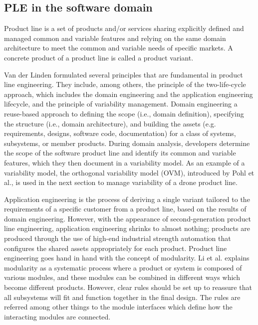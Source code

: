 \documentclass[sigconf,review]{acmart}
\begin{document}
\subsection{PLE in the software domain}
\label{sec:product line engineering}


Product line is a set of products and/or services sharing explicitly defined and managed common and variable features and relying on the same domain architecture to meet the common and variable needs of specific markets.
A concrete product of a product line is called a product variant.

Van der Linden formulated several principles that are fundamental in product line engineering. 
They include, among others, the principle of the two-life-cycle approach, which includes the domain engineering and the application engineering lifecycle, and the principle of variability management.
Domain engineering a reuse-based approach to defining the scope (i.e., domain definition), specifying the structure (i.e., domain architecture), and building the assets (e.g. requirements, designs, software code, documentation) for a class of systems, subsystems, or member products.
During domain analysis, developers determine the scope of the software product line and identify its common and variable features, which they then document in a variability model.
As an example of a variability model, the orthogonal variability model (OVM), introduced by Pohl et al., is used in the next section to manage variability of a drone product line. 

Application engineering is the process of deriving a single variant tailored to the requirements of a specific customer from a product line, based on the results of domain engineering. 
However, with the appearance of second-generation product line engineering, application engineering shrinks to almost nothing; products are produced through the use of high-end industrial strength automation that configures the shared assets appropriately for each product.
Product line engineering goes hand in hand with the concept of modularity.
Li et al. explains modularity as a systematic process where a product or system is composed of various modules, and these modules can be combined in different ways which become different products.
However, clear rules should be set up to reassure that all subsystems will fit and function together in the final design.
The rules are referred among other things to the module interfaces which define how the interacting modules are connected.
\end{document}
